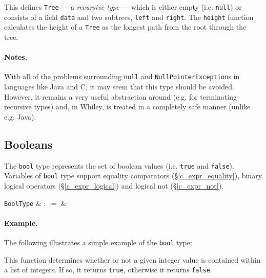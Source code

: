 

This defines \lstinline{Tree} --- a {\em recursive type} --- which is either empty (i.e. \lstinline{null}) or consists of a field \lstinline{data} and two subtrees, \lstinline{left} and \lstinline{right}.  The \lstinline{height} function calculates the height of a \lstinline{Tree} as the longest path from the root through the tree.

\paragraph{Notes.}  With all of the problems surrounding \lstinline{null} and \lstinline{NullPointerException}s in languages like Java and C, it may seem that this type should be avoided. However, it remains a very useful abstraction around (e.g. for terminating recursive types) and, in Whiley, is treated in a completely safe manner (unlike e.g. Java).


\subsection{Booleans}
\label{c_types_bool}

The \lstinline{bool} type represents the set of boolean values (i.e. \lstinline{true} and \lstinline{false}).  Variables of \lstinline{bool} type support equality comparators (\S\ref{c_expr_equality}), binary logical operators (\S\ref{c_expr_logical}) and logical not (\S\ref{c_expr_not}).

\begin{syntax}
 \verb+BoolType+ & $::=$ &  \\
\end{syntax}

\paragraph{Example.} The following illustrates a simple example of the \lstinline{bool} type:



This function determines whether or not a given integer value is contained within a list of integers.  If so, it returns \lstinline{true}, otherwise it returns \lstinline{false}.

